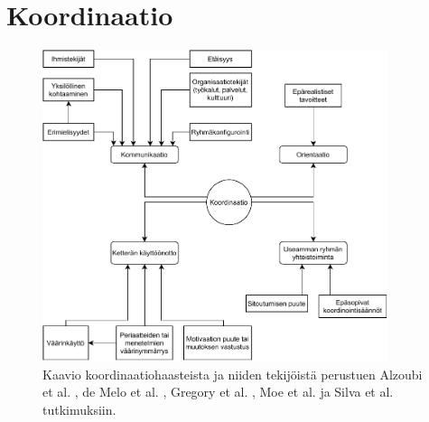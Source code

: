 \chapter{Koordinaatio}

\begin{figure}[t]
\centering 
\includegraphics[width=0.9\textwidth]{template/figures/koordinaatiohaasteet.pdf}
\caption{Kaavio koordinaatiohaasteista ja niiden tekijöistä perustuen Alzoubi et al. \cite{ALZOUBI201622}, de Melo et al. \cite{DEOMELO2013412}, Gregory et al. \cite{GREGORY201692}, Moe et al. \cite{MOE2012853} ja Silva et al. \cite{SELLERISILVA201520} tutkimuksiin.\label{fig:koordinaatiohaasteet}}
\end{figure}

